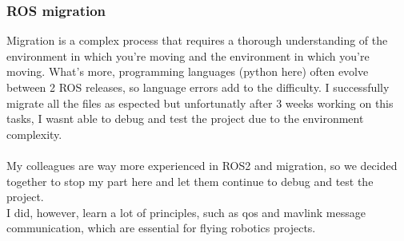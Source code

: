 \subsubsection{ROS migration}
Migration is a complex process that requires a thorough understanding of the environment in which you're moving and the environment in which you're moving. What's more, programming languages (python here) often evolve between 2 ROS releases, so language errors add to the difficulty.
I successfully migrate all the files as espected but unfortunatly after 3 weeks working on this tasks, I wasnt able to debug and test the project due to the environment complexity.
\\ \\
My colleagues are way more experienced in ROS2 and migration, so we decided together to stop my part here and let them continue to debug and test the project.\\
I did, however, learn a lot of principles, such as \gls{qos} and \gls{mavlink} message communication, which are essential for flying robotics projects.
